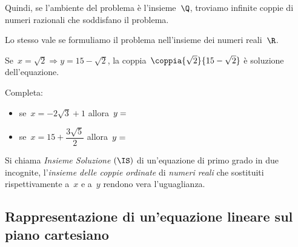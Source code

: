 \begin{soluzione}
Quindi, se l'ambiente del problema è
l'insieme~\(\Q\), troviamo infinite coppie di
numeri razionali che soddisfano il problema.

Lo stesso vale se formuliamo il problema nell'insieme dei
numeri reali~\(\R\).

Se~\(x=\sqrt{2}\Rightarrow y=15-\sqrt{2}\), la 
coppia~\(\coppia{\sqrt{2}}{15-\sqrt{2}}\) è soluzione
dell'equazione. 


Completa:

\begin{itemize} [nosep]
\item se~\(x=-2\sqrt{3}+1\) allora~\(y=\dotfill\)
\item se~\(x=15+\dfrac{3\sqrt{5}}{2}\) allora~\(y=\dotfill\)
\end{itemize}
\end{soluzione}

\begin{definizione}{}{}
Si chiama \emph{Insieme Soluzione} \((\IS)\) di un'equazione di primo
grado in due incognite, l'\emph{insieme delle coppie
ordinate} di \emph{numeri reali} che sostituiti rispettivamente a~\(x\) e
a~\(y\) rendono vera l'uguaglianza.
\end{definizione}


\subsection{Rappresentazione di un'equazione lineare sul piano cartesiano}

